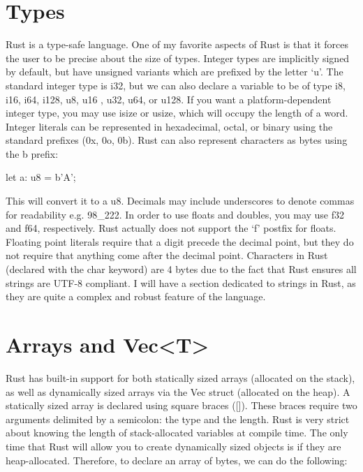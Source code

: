 \documentclass{article}
\begin{document}
\section{Types}

Rust is a type-safe language. One of my favorite aspects of Rust is that it forces the 
user to be precise about the size of types. Integer types are implicitly signed by default, but have 
unsigned variants which are prefixed by the letter ‘u’. The standard integer type is i32, but we 
can also declare a variable to be of type i8, i16, i64, i128, u8, u16
, u32, u64, or u128. If you want a platform-dependent integer type, you may 
use isize or usize, which will occupy the length of a word. Integer literals can be represented in hexadecimal, 
octal, or binary using the standard prefixes (0x, 0o, 0b). Rust can also represent characters as bytes using 
the b prefix:

\begin{rustlst}

let a: u8 = b’A’;

\end{rustlst}

This will convert it to a u8. Decimals may include underscores to denote commas for readability e.g. 
98\_222. In order to use floats and doubles, you may use f32 and f64, respectively. Rust 
actually does not support the ‘f’ postfix for floats. Floating point literals require that a digit precede 
the decimal point, but they do not require that anything come after the decimal point. Characters in Rust 
(declared with the char keyword) are 4 bytes due to the fact that Rust ensures all strings are 
UTF-8 compliant. I will have a section dedicated to strings in Rust, as they are quite 
a complex and robust feature of the language. 

\section{Arrays and Vec<T>}

Rust has built-in support for both statically sized arrays (allocated on the stack), as well as 
dynamically sized arrays via the Vec struct (allocated on the heap). A statically sized array is declared using 
square braces ([]). These braces require two arguments delimited by a semicolon: the type and the length. 
Rust is very strict about knowing the length of stack-allocated variables at compile time. The only 
time that Rust will allow you to create dynamically sized objects is if they are heap-allocated. Therefore, 
to declare an array of bytes, we can do the following:
 
\end{document}
